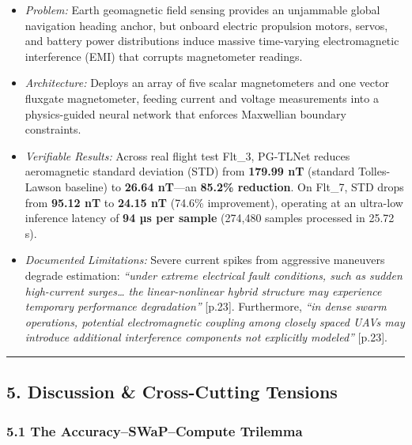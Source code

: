 \documentclass[journal]{IEEEtran}
\begin{document}
\begin{enumerate}
  \begin{itemize}
  \tightlist
  \item
    \emph{Problem:} Earth geomagnetic field sensing provides an
    unjammable global navigation heading anchor, but onboard electric
    propulsion motors, servos, and battery power distributions induce
    massive time-varying electromagnetic interference (EMI) that
    corrupts magnetometer readings.
  \item
    \emph{Architecture:} Deploys an array of five scalar magnetometers
    and one vector fluxgate magnetometer, feeding current and voltage
    measurements into a physics-guided neural network that enforces
    Maxwellian boundary constraints.
  \item
    \emph{Verifiable Results:} Across real flight test Flt\_3, PG-TLNet
    reduces aeromagnetic standard deviation (STD) from \textbf{179.99
    nT} (standard Tolles-Lawson baseline) to \textbf{26.64 nT}---an
    \textbf{85.2\% reduction}. On Flt\_7, STD drops from \textbf{95.12
    nT} to \textbf{24.15 nT} (74.6\% improvement), operating at an
    ultra-low inference latency of \textbf{94 µs per sample} (274,480
    samples processed in 25.72 s).
  \item
    \emph{Documented Limitations:} Severe current spikes from aggressive
    maneuvers degrade estimation: \emph{``under extreme electrical fault
    conditions, such as sudden high-current surges\ldots{} the
    linear-nonlinear hybrid structure may experience temporary
    performance degradation''} {[}p.23{]}. Furthermore, \emph{``in dense
    swarm operations, potential electromagnetic coupling among closely
    spaced UAVs may introduce additional interference components not
    explicitly modeled''} {[}p.23{]}.
  \end{itemize}
\end{enumerate}

\begin{center}\rule{0.5\linewidth}{0.5pt}\end{center}

\subsection{5. Discussion \& Cross-Cutting
Tensions}\label{discussion-cross-cutting-tensions}

\subsubsection{5.1 The Accuracy--SWaP--Compute
Trilemma}\label{the-accuracyswapcompute-trilemma}
\end{document}
